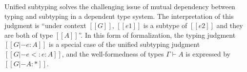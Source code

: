 Unified subtyping solves the challenging issue of mutual dependency between typing
and subtyping in a dependent type system.
The interpretation of this judgment is ``under context $[[G]]$, $[[e1]]$ is a
subtype of $[[e2]]$ and they are both of type $[[A]]$''.
In this form of formalization, the typing judgment $[[G |- e : A]]$ is a
special case of the unified subtyping judgment $[[G |- e <: e : A]]$,
and the well-formedness of types $\Gamma \vdash A$ is expressed by
$[[G |- A : *]]$.

